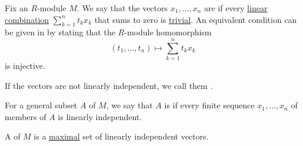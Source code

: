 \begin{definition}\label{def:module_linear_dependence}\mimprovised
  Fix an \( R \)-module \( M \). We say that the vectors \( x_1, \ldots, x_n \) are  if every \hyperref[def:linear_combination]{linear combination} \( \sum_{k=1}^n t_k x_k \) that sums to zero is \hyperref[def:linear_combination/trivial]{trivial}. An equivalent condition can be given in by stating that the \( R \)-module homomorphism
  \begin{equation*}
    (t_1, \ldots, t_n) \mapsto \sum_{k=1}^n t_k x_k
  \end{equation*}
  is injective.

  If the vectors are not linearly independent, we call them .

  For a general subset \( A \) of \( M \), we say that \( A \) is  if every finite sequence \( x_1, \ldots, x_n \) of members of \( A \) is linearly independent.

  A  of \( M \) is a \hyperref[def:partially_ordered_set_extremal_points/maximal_and_minimal_element]{maximal} set of linearly independent vectors.
\end{definition}

